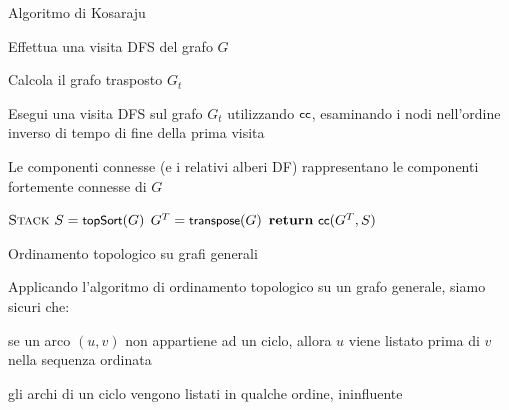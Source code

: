\begin{frame}{Algoritmo di Kosaraju}

\vspace{-9pt}
\begin{myboxtitle}
\BI
\item Effettua una visita DFS del grafo $G$
\item Calcola il grafo trasposto $G_t$
\item Esegui una visita DFS sul grafo $G_t$ utilizzando $\textsf{{\small cc}}$, esaminando i nodi nell'ordine inverso di tempo di fine della prima visita
\item Le componenti connesse (e i relativi alberi DF) rappresentano le componenti fortemente connesse di $G$
\EI
\end{myboxtitle}

\begin{Procedure}
\caption[A]{$\INTEGER[\,]$ \scc($\Graph\ G$)}

  $\textsc{Stack}\ S = \textsf{{\small topSort}}(G)$
  $G^T = \textsf{{\small transpose}}(G)$
  $\Return\ \connectedcomponents(G^T, S)$

\end{Procedure}
\end{frame}

\begin{frame}{Ordinamento topologico su grafi generali}

\vspace{-6pt}
\begin{myboxtitle}
Applicando l'algoritmo di ordinamento topologico su un grafo generale, siamo
sicuri che:
\BIL
\item se un arco $(u,v)$ non appartiene ad un ciclo, allora $u$ viene listato
prima di $v$ nella sequenza ordinata
\item gli archi di un ciclo vengono listati in qualche ordine, ininfluente
\EIL
\end{myboxtitle}



\end{frame}

